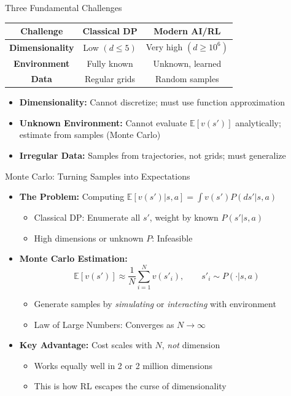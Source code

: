 \documentclass[10pt,english,aspectratio=169]{beamer}
\begin{document}
\begin{frame}{Three Fundamental Challenges}
\begin{center}
\renewcommand{\arraystretch}{1.4}
\begin{tabular}{|c|c|c|}
\hline
\textbf{Challenge} & \textbf{Classical DP} & \textbf{Modern AI/RL} \\
\hline
\textbf{Dimensionality} & Low $(d \leq 5)$ & Very high $(d \geq 10^6)$ \\
\hline
\textbf{Environment} & Fully known & Unknown, learned \\
\hline
\textbf{Data} & Regular grids & Random samples \\
\hline
\end{tabular}
\end{center}

\bigskip
\begin{itemize}
\item \textbf{Dimensionality:} Cannot discretize; must use function approximation
\item \textbf{Unknown Environment:} Cannot evaluate $\mathbb{E}[v(s')]$ analytically; estimate from samples (Monte Carlo)
\item \textbf{Irregular Data:} Samples from trajectories, not grids; must generalize
\end{itemize}
\end{frame}

\begin{frame}{Monte Carlo: Turning Samples into Expectations}
\begin{itemize}
\item \textbf{The Problem:} Computing $\mathbb{E}[v(s') | s, a] = \int v(s') P(ds'|s, a)$
\begin{itemize}
    \item Classical DP: Enumerate all $s'$, weight by known $P(s'|s, a)$
    \item High dimensions or unknown $P$: Infeasible
\end{itemize}

\medskip
\item \textbf{Monte Carlo Estimation:}
\[
\mathbb{E}[v(s')] \approx \frac{1}{N} \sum_{i=1}^{N} v(s'_i), \qquad s'_i \sim P(\cdot | s, a)
\]
\begin{itemize}
    \item Generate samples by \emph{simulating} or \emph{interacting} with environment
    \item Law of Large Numbers: Converges as $N \to \infty$
\end{itemize}

\medskip
\item \textbf{Key Advantage:} Cost scales with $N$, \emph{not} dimension
\begin{itemize}
    \item Works equally well in 2 or 2 million dimensions
    \item This is how RL escapes the curse of dimensionality
\end{itemize}
\end{itemize}
\end{frame}
\end{document}
